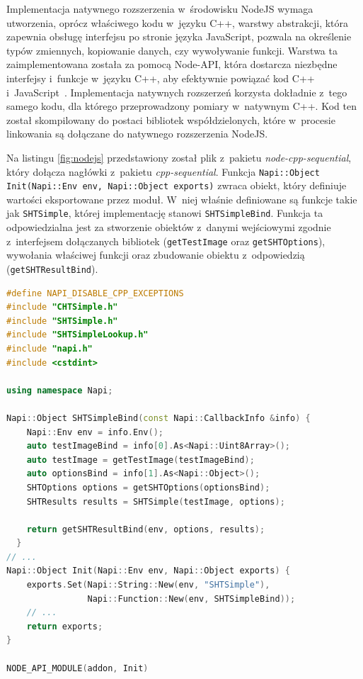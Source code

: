 Implementacja natywnego rozszerzenia w~środowisku NodeJS wymaga utworzenia, oprócz właściwego kodu w~języku C++, warstwy abstrakcji, która zapewnia obsługę interfejsu po stronie języka JavaScript, pozwala na określenie typów zmiennych, kopiowanie danych, czy wywoływanie funkcji. Warstwa ta zaimplementowana została za pomocą Node-API, która dostarcza niezbędne interfejsy i~funkcje w~języku C++, aby efektywnie powiązać kod C++ i~JavaScript~\cite{napi}. Implementacja natywnych rozszerzeń korzysta dokładnie z~tego samego kodu, dla którego przeprowadzony pomiary w~natywnym C++. Kod ten został skompilowany do postaci bibliotek współdzielonych, które w~procesie linkowania są dołączane do natywnego rozszerzenia NodeJS. 

Na listingu \ref{fig:nodejs} przedstawiony został plik z~pakietu \textit{node-cpp-sequential}, który dołącza nagłówki z~pakietu \textit{cpp-sequential}. Funkcja \lstinline{Napi::Object Init(Napi::Env env, Napi::Object exports)} zwraca obiekt, który definiuje wartości eksportowane przez moduł. W~niej właśnie definiowane są funkcje takie jak \lstinline{SHTSimple}, której implementację stanowi \lstinline{SHTSimpleBind}. Funkcja ta odpowiedzialna jest za stworzenie obiektów z~danymi wejściowymi zgodnie z~interfejsem dołączanych bibliotek (\lstinline{getTestImage} oraz \lstinline{getSHTOptions}), wywołania właściwej funkcji oraz zbudowanie obiektu z~odpowiedzią (\lstinline{getSHTResultBind}).

\begin{lstlisting}[language=C++, float=h, caption=Plik powiązania kodu C++ z~JavaScript, label=lst:cpp-js]
#define NAPI_DISABLE_CPP_EXCEPTIONS
#include "CHTSimple.h"
#include "SHTSimple.h"
#include "SHTSimpleLookup.h"
#include "napi.h"
#include <cstdint>

using namespace Napi;
    
Napi::Object SHTSimpleBind(const Napi::CallbackInfo &info) {
    Napi::Env env = info.Env();
    auto testImageBind = info[0].As<Napi::Uint8Array>();
    auto testImage = getTestImage(testImageBind);
    auto optionsBind = info[1].As<Napi::Object>();
    SHTOptions options = getSHTOptions(optionsBind);
    SHTResults results = SHTSimple(testImage, options);
  
    return getSHTResultBind(env, options, results);
  }
// ...
Napi::Object Init(Napi::Env env, Napi::Object exports) {
    exports.Set(Napi::String::New(env, "SHTSimple"),
                Napi::Function::New(env, SHTSimpleBind));
    // ...
    return exports;
}
  
NODE_API_MODULE(addon, Init)
\end{lstlisting}

